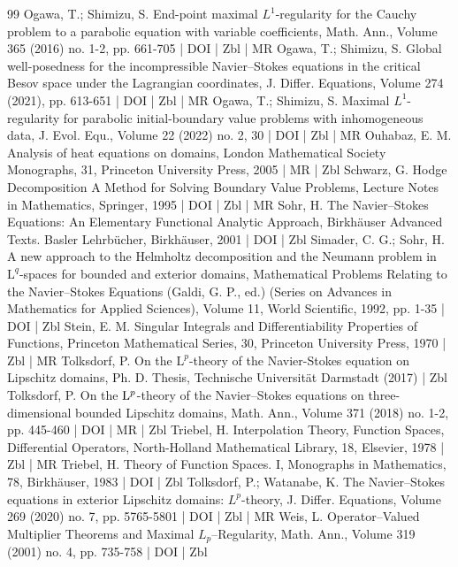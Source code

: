 \begin{thebibliography}{99}
 Ogawa, T.; Shimizu, S. End-point maximal ${L}^1$-regularity for the Cauchy problem to a parabolic equation with variable coefficients, Math. Ann., Volume 365 (2016) no. 1-2, pp. 661-705 | DOI | Zbl | MR
 Ogawa, T.; Shimizu, S. Global well-posedness for the incompressible Navier–Stokes equations in the critical Besov space under the Lagrangian coordinates, J. Differ. Equations, Volume 274 (2021), pp. 613-651 | DOI | Zbl | MR
 Ogawa, T.; Shimizu, S. Maximal ${L}^1$-regularity for parabolic initial-boundary value problems with inhomogeneous data, J. Evol. Equ., Volume 22 (2022) no. 2, 30 | DOI | Zbl | MR
 Ouhabaz, E. M. Analysis of heat equations on domains, London Mathematical Society Monographs, 31, Princeton University Press, 2005 | MR | Zbl
 Schwarz, G. Hodge Decomposition A Method for Solving Boundary Value Problems, Lecture Notes in Mathematics, Springer, 1995 | DOI | Zbl | MR
 Sohr, H. The Navier–Stokes Equations: An Elementary Functional Analytic Approach, Birkhäuser Advanced Texts. Basler Lehrbücher, Birkhäuser, 2001 | DOI | Zbl
 Simader, C. G.; Sohr, H. A new approach to the Helmholtz decomposition and the Neumann problem in $\mathrm{L}^q$-spaces for bounded and exterior domains, Mathematical Problems Relating to the Navier–Stokes Equations (Galdi, G. P., ed.) (Series on Advances in Mathematics for Applied Sciences), Volume 11, World Scientific, 1992, pp. 1-35 | DOI | Zbl
 Stein, E. M. Singular Integrals and Differentiability Properties of Functions, Princeton Mathematical Series, 30, Princeton University Press, 1970 | Zbl | MR
 Tolksdorf, P. On the $\mathrm{L}^p$-theory of the Navier-Stokes equation on Lipschitz domains, Ph. D. Thesis, Technische Universität Darmstadt (2017) | Zbl
 Tolksdorf, P. On the ${\rm {L}}^p$-theory of the Navier–Stokes equations on three-dimensional bounded Lipschitz domains, Math. Ann., Volume 371 (2018) no. 1-2, pp. 445-460 | DOI | MR | Zbl
 Triebel, H. Interpolation Theory, Function Spaces, Differential Operators, North-Holland Mathematical Library, 18, Elsevier, 1978 | Zbl | MR
 Triebel, H. Theory of Function Spaces. I, Monographs in Mathematics, 78, Birkhäuser, 1983 | DOI | Zbl
 Tolksdorf, P.; Watanabe, K. The Navier–Stokes equations in exterior Lipschitz domains: ${L}^p$-theory, J. Differ. Equations, Volume 269 (2020) no. 7, pp. 5765-5801 | DOI | Zbl | MR
 Weis, L. Operator–Valued Multiplier Theorems and Maximal ${L}_p$–Regularity, Math. Ann., Volume 319 (2001) no. 4, pp. 735-758 | DOI | Zbl
\end{thebibliography}
